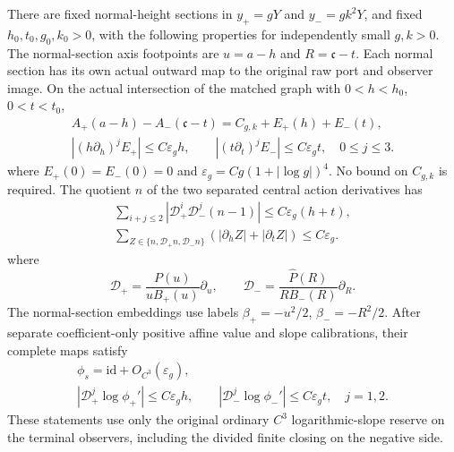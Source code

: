 \begin{lemma}
There are fixed normal-height sections in \(y_+=gY\) and
\(y_-=gk^2Y\), and fixed \(h_0,t_0,g_0,k_0>0\), with the
following properties for independently small \(g,k>0\).
The normal-section axis footpoints are \(u=a-h\) and
\(R=\mathfrak c-t\). Each normal section has its own actual outward
map to the original raw port and observer image.
On the actual intersection of the matched graph with
\(0<h<h_0\), \(0<t<t_0\),
\begin{equation}
 \begin{gathered}
 A_+(a-h)-A_-(\mathfrak c-t)=C_{g,k}+E_+(h)+E_-(t),\\
 |(h\partial_h)^jE_+|\le C\varepsilon_g h,\qquad
 |(t\partial_t)^jE_-|\le C\varepsilon_g t,\quad 0\le j\le3.
 \end{gathered}
 \label{deg:joint-root-normal-weighted-matching}
\end{equation}
where \(E_+(0)=E_-(0)=0\) and
\(\varepsilon_g=Cg(1+|\log g|)^4\).
No bound on \(C_{g,k}\) is required.
The quotient \(n\) of the two separated central action derivatives
has
\begin{equation}
 \begin{gathered}
 \sum_{i+j\le2}
 |\mathcal D_+^i\mathcal D_-^j(n-1)|
 \le C\varepsilon_g(h+t),\\
 \sum_{Z\in\{n,\mathcal D_+n,\mathcal D_-n\}}
 (|\partial_hZ|+|\partial_tZ|)\le C\varepsilon_g .
 \end{gathered}
 \label{deg:joint-root-normal-matching-rows}
\end{equation}
where
\[
 \mathcal D_+=\frac{P(u)}{uB_+(u)}\partial_u,\qquad
 \mathcal D_-=\frac{\widehat P(R)}{RB_-(R)}\partial_R.
\]
The normal-section embeddings use labels
\(\beta_+=-u^2/2\), \(\beta_-=-R^2/2\). After separate
coefficient-only positive affine value and slope calibrations,
their complete maps satisfy
\begin{equation}
 \begin{gathered}
 \phi_s=\mathrm{id}+O_{C^3}(\varepsilon_g),\\
 |\mathcal D_+^j\log\phi_+'|\le C\varepsilon_g h,\qquad
 |\mathcal D_-^j\log\phi_-'|\le C\varepsilon_g t,\quad j=1,2.
 \end{gathered}
 \label{deg:joint-root-normal-outer-rows}
\end{equation}
These statements use only the original ordinary \(C^3\)
logarithmic-slope reserve on the terminal observers, including the
divided finite closing on the negative side.


\end{lemma}
